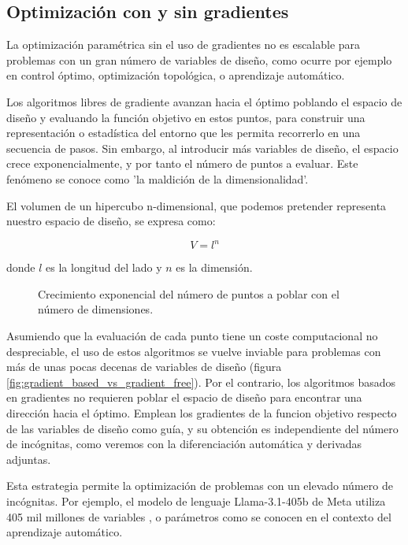 \subsection{Optimización con y sin gradientes}

La optimización paramétrica sin el uso de gradientes no es escalable para
problemas con un gran número de variables de diseño, como ocurre por ejemplo en
control óptimo, optimización topológica, o aprendizaje automático.

Los algoritmos libres de gradiente avanzan hacia el óptimo poblando el espacio
de diseño y evaluando la función objetivo en estos puntos, para construir una
representación o estadística del entorno que les permita recorrerlo en una
secuencia de pasos. Sin embargo, al introducir más variables de diseño, el
espacio crece exponencialmente, y por tanto el número de puntos a evaluar. Este
fenómeno se conoce como 'la maldición de la dimensionalidad'.

El volumen de un hipercubo n-dimensional, que podemos pretender representa
nuestro espacio de diseño, se expresa como:

\begin{equation}
	V = l^n
\end{equation}

donde $l$ es la longitud del lado y $n$ es la dimensión.


\begin{figure}[h] \centering
	\centering
	
	\caption{Crecimiento exponencial del número de puntos a poblar con el número de dimensiones.}
	\label{fig:hypercube}
\end{figure}

Asumiendo que la evaluación de cada punto tiene un coste computacional no
despreciable, el uso de estos algoritmos se vuelve inviable para problemas con
más de unas pocas decenas de variables de diseño (figura
\ref{fig:gradient_based_vs_gradient_free}). Por el contrario, los algoritmos
basados en gradientes no requieren poblar el espacio de diseño para encontrar
una dirección hacia el óptimo. Emplean los gradientes de la funcion objetivo
respecto de las variables de diseño como guía, y su obtención es independiente
del número de incógnitas, como veremos con la diferenciación automática y
derivadas adjuntas.

Esta estrategia permite la optimización de problemas con un elevado número de
incógnitas. Por ejemplo, el modelo de lenguaje Llama-3.1-405b de Meta utiliza
405 mil millones de variables \cite{dubey2024llama}, o parámetros como se
conocen en el contexto del aprendizaje automático.

